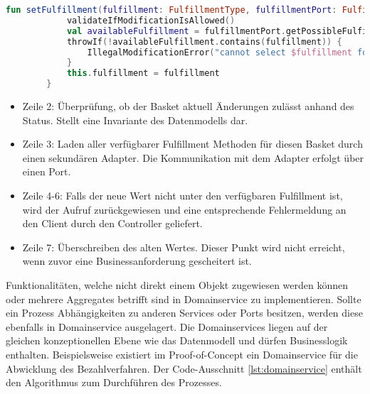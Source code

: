
\begin{minipage}{\linewidth} %
	\begin{lstlisting}[caption={Setzen der Fulfillment Methode im Basket Aggregate}, label={lst:basket}, language=Kotlin]
		fun setFulfillment(fulfillment: FulfillmentType, fulfillmentPort: FulfillmentPort) {
			validateIfModificationIsAllowed()
			val availableFulfillment = fulfillmentPort.getPossibleFulfillment(outletId)
			throwIf(!availableFulfillment.contains(fulfillment)) {
				IllegalModificationError("cannot select $fulfillment for outlet $outletId")
			}
			this.fulfillment = fulfillment
		}
	\end{lstlisting}
\end{minipage}

\begin{itemize}[noitemsep,nolistsep]
	\item Zeile 2: Überprüfung, ob der Basket aktuell Änderungen zulässt anhand des Status. Stellt eine Invariante des Datenmodells dar.
	\item Zeile 3: Laden aller verfügbarer Fulfillment Methoden für diesen Basket durch einen sekundären Adapter. Die Kommunikation mit dem Adapter erfolgt über einen Port.
	\item Zeile 4-6: Falls der neue Wert nicht unter den verfügbaren Fulfillment ist, wird der Aufruf zurückgewiesen und eine entsprechende Fehlermeldung an den Client durch den Controller geliefert.
	\item Zeile 7: Überschreiben des alten Wertes. Dieser Punkt wird nicht erreicht, wenn zuvor eine Businessanforderung gescheitert ist.
\end{itemize}

Funktionalitäten, welche nicht direkt einem Objekt zugewiesen werden können oder mehrere Aggregates betrifft sind in Domainservice zu implementieren. Sollte ein Prozess Abhängigkeiten zu anderen Services oder Ports besitzen, werden diese ebenfalls in Domainservice ausgelagert. Die Domainservices liegen auf der gleichen konzeptionellen Ebene wie das Datenmodell und dürfen Businesslogik enthalten. Beispielsweise existiert im Proof-of-Concept ein Domainservice für die Abwicklung des Bezahlverfahren. Der Code-Ausschnitt \ref{lst:domainservice} enthält den Algorithmus zum Durchführen des Prozesses. 

